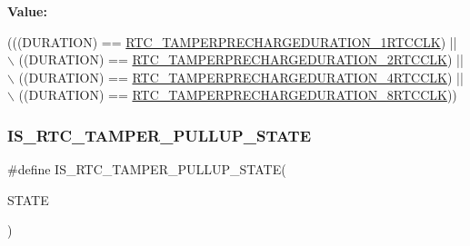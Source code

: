 {\bfseries Value\+:}
\begin{DoxyCode}
(((DURATION) == \hyperlink{group___r_t_c_ex___tamper___pin___precharge___duration___definitions_gac2a79623b1690b2e5893e6b53dad3480}{RTC\_TAMPERPRECHARGEDURATION\_1RTCCLK}) || \(\backslash\)
                                                    ((DURATION) == 
      \hyperlink{group___r_t_c_ex___tamper___pin___precharge___duration___definitions_ga270be6ced6bafda4a94e5624a0bc3eab}{RTC\_TAMPERPRECHARGEDURATION\_2RTCCLK}) || \(\backslash\)
                                                    ((DURATION) == 
      \hyperlink{group___r_t_c_ex___tamper___pin___precharge___duration___definitions_ga12497acabf044c2d1de7d735efdb2efc}{RTC\_TAMPERPRECHARGEDURATION\_4RTCCLK}) || \(\backslash\)
                                                    ((DURATION) == 
      \hyperlink{group___r_t_c_ex___tamper___pin___precharge___duration___definitions_ga353fca64c5b0e927ab024ed13a526e09}{RTC\_TAMPERPRECHARGEDURATION\_8RTCCLK}))
\end{DoxyCode}
\mbox{\label{group___r_t_c_ex___i_s___r_t_c___definitions_gaad007ed47ef7ae636945088c93e42f5d}} 
\subsubsection{\texorpdfstring{I\+S\+\_\+\+R\+T\+C\+\_\+\+T\+A\+M\+P\+E\+R\+\_\+\+P\+U\+L\+L\+U\+P\+\_\+\+S\+T\+A\+TE}{IS\_RTC\_TAMPER\_PULLUP\_STATE}}
{\footnotesize\ttfamily \#define I\+S\+\_\+\+R\+T\+C\+\_\+\+T\+A\+M\+P\+E\+R\+\_\+\+P\+U\+L\+L\+U\+P\+\_\+\+S\+T\+A\+TE(\begin{DoxyParamCaption}\item[{}]{S\+T\+A\+TE }\end{DoxyParamCaption})}

